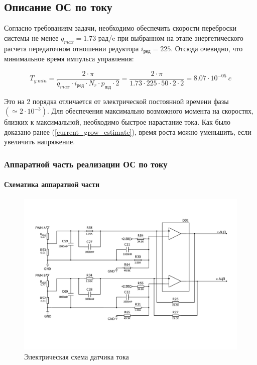 \newpage
\subsection{Описание ОС по току}
Согласно требованиям задачи, необходимо обеспечить скорости переброски системы не менее
$ \dot{q}_{max} = 1.73 $ рад/c при выбранном на этапе энергетического расчета передаточном
отношении редуктора $ i_\text{ред} = 225 $. Отсюда очевидно, что минимальное время импульса управления:

$$
    T_{y.min} = \frac{ 2 \cdot \pi }{ \dot{q}_{max} \cdot i_\text{ред} \cdot N_{r} \cdot p_{\text{шд}} \cdot 2 }
    = \frac{ 2 \cdot \pi }{ 1.73 \cdot 225 \cdot 50 \cdot 2 \cdot 2 }
    = 8.07 \cdot 10^{-05} ~c
$$

Это на 2 порядка отличается от электрической постоянной времени фазы $( \simeq2 \cdot 10^{-3} )$.
Для обеспечения максимально возможного момента на скоростях, близких к максимальной, необходимо
быстрое нарастание тока. Как было доказано ранее (\ref{current_grow_estimate}), время роста можно
уменьшить, если увеличить напряжение.

\subsubsection{Аппаратной часть реализации ОС по току}

\paragraph{Схематика аппаратной части}
\begin{figure}[ht!]
    \centering
    \includegraphics[width=\textwidth, keepaspectratio, clip=true, trim=0mm 25mm 0mm 25mm]
                    {./src/pictures/current_measuring_sheme}
    \caption{Электрическая схема датчика тока}
    \label{pic_current_measuring_sheme}
\end{figure}

